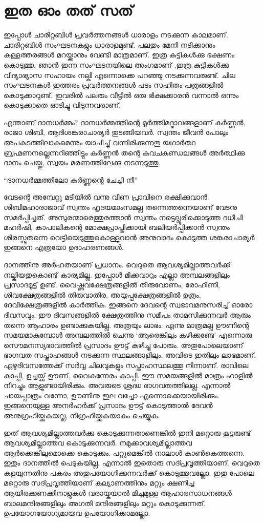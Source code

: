 \chapter{ഇത ഓം തത് സത്}
ഇപ്പോൾ ചാരിറ്റബിൾ പ്രവർത്തനങ്ങൾ ധാരാളം നടക്കുന്ന കാലമാണ്‌. ചാരിറ്റബിൾ സംഘടനകളും ധാരാളമുണ്ട്‌. പലതും മേനി നടിക്കാനും കള്ളത്തരങ്ങൾ മറയ്ക്കാനും വേണ്ടി മാത്രമാണ്‌. ഇത്ര കുട്ടികൾക്കു ഭക്ഷണം കൊടുത്തു, ഞാൻ ഇന്ന സംഘടനയിലെ അംഗമാണ്‌ ,ഇത്ര കുട്ടികൾക്കു വിദ്യാഭ്യാസ സഹായം നല്കി എന്നൊക്കെ പറഞ്ഞു നടക്കുന്നവരുണ്ട്‌. ചില സംഘടനകൾ ഇത്തരം പ്രവർത്തനങ്ങൾ പടം സഹിതം പത്രങ്ങളിൽ കൊടുക്കാറുണ്ട്‌. ഇവരിൽ പലരും വീട്ടിൽ ഒരു ഭിക്ഷക്കാരൻ വന്നാൽ ഒന്നും കൊടുക്കാതെ ഓടിച്ചു വിടുന്നവരാണ്‌. \par
എന്താണ്‌ ദാനധർമ്മം? ദാനധർമ്മത്തിന്റെ മൂർത്തിമദ്ഭാവങ്ങളാണ്‌ കർണ്ണൻ, രാജാ ശിബി, ആദിശങ്കരാചാര്യർ തുടങ്ങിയവർ. സ്വന്തം ജീവൻ പോലും അപകടത്തിലാകുമെന്നും യാചിച്ചു് വന്നിരിക്കുന്നതു യഥാർത്ഥ ബ്രഹ്മണനല്ലെന്നറിഞ്ഞിട്ടും കർണ്ണൻ തന്റെ കവചകുണ്ഡലങ്ങൾ അർത്ഥിക്കു ദാനം ചെയ്തു, സ്വയം മരണത്തിലേക്കു നടന്നടുത്തു.
\begin{center}
“ദാനധർമ്മത്തിലോ കർണ്ണന്റെ ചേച്ചി നീ”
\end{center}
വേടന്റെ അമ്പേറ്റു മടിയിൽ വന്നു വീണ പ്രാവിനെ രക്ഷിക്കുവാൻ ശിബിമഹാരാജാവ് സ്വന്തം ഹൃദയമാംസമല്ല തന്നെത്തന്നെയാണ്‌ വേടനു സമർപ്പിച്ചത്. അസുരന്മാരെത്തുരത്താൻ സ്വന്തം നട്ടെല്ലൂരിക്കൊടുത്ത ദധീചി മഹർഷി, കാപാലികന്റെ മോക്ഷപ്രാപ്തിക്കായി ബലിയർപ്പിക്കാൻ സ്വന്തം ശിരസ്സുതന്നെ വെട്ടിയെടുത്തുകൊള്ളുവാൻ അനുവാദം കൊടുത്ത ശങ്കരാചാര്യർ ഇങ്ങനെ എത്രയോ ഉദാഹരണങ്ങൾ. \par
ദാനത്തിനു അർഹതയാണ്‌ പ്രധാനം. വെറുതെ ആവശ്യമില്ലാത്തവർക്ക് നല്കിയതുകൊണ്ട് കാര്യമില്ല. ഇപ്പോൾ മിക്കവാറും എല്ലാ അമ്പലങ്ങളിലും പ്രസാദമൂട്ട് ഉണ്ട്. വൈഷ്ണവക്ഷേത്രങ്ങളിൽ തിരുവോണം, രോഹിണി, ശിവക്ഷേത്രങ്ങളിൽ തിരുവാതിര, അയ്യപ്പക്ഷേത്രങ്ങളിൽ ഉത്രം, ദേവീക്ഷേത്രങ്ങളിൽ കാർത്തിക. ഇങ്ങനെ ദേവന്റെ സ്വഭാവമനുസരിച്ച് ഓരോ ദിവസവും. ഈ ദിവസങ്ങളിൽ ക്ഷേത്രത്തിനു സമീപം താമസിക്കുന്നവർ ആരും തന്നെ ആഹാരം ഉണ്ടാക്കുകയില്ല. അത്രയും ലാഭം. എന്നു മാത്രമല്ല ഊണിന്റെ സമയമാകുമ്പോൾ അമ്പലത്തിൽ  ചെന്നു ‘ആരെങ്കിലും കഴിക്കണ്ടേ’ എന്നൊരു സൌമനസ്യഭാവത്തിൽ പ്രസാദം ഊട്ട് കഴിച്ചു പോരും. അതുപോലെയാണ്‌ ഭാഗവത സപ്താഹങ്ങൾ നടക്കുന്ന സ്ഥലങ്ങാളിലും. അവിടെ ഇതിലും ലാഭമാണ്‌. ഏഴുദിവസത്തേക്ക് സർവ്വ ചിലവുകളും സപ്താഹസ്ഥലത്തു നിന്നാണ്‌. രാവിലെ കാപ്പി, ഉച്ചയ്ക്ക് ഊണ്, വൈകുന്നേരം കാപ്പി. ഈ സമയങ്ങളിൽ മാത്രം ഹാളിൽ നിറച്ചും ആളുണ്ടായിരിക്കും. അവരുടെ ശ്രദ്ധ ഭാഗവതത്തിലല്ല. എന്നാൽ ചായപ്പാത്രം വന്നോ, ഊണിനു ഇല വച്ചോ എന്നൊക്കെയായിരിക്കും. ഇങ്ങനെയുള്ള അനർഹർക്ക് പ്രസാദം ഊട്ട് കൊടുത്താൽ ദേവൻ അനുഗ്രഹിയ്ക്കുകയല്ല, നിഗ്രഹിയ്ക്കുകയാകും ചെയ്യുക.\par
ഇത് ആവശ്യമില്ലാത്തവർക്കു കൊടുക്കുന്നതാണെങ്കിൽ ഇനി മറ്റൊരു കൂട്ടരുണ്ട് ആവശ്യമില്ലാത്തവ കൊടുക്കുന്നവർ. നമുക്കാവശ്യമില്ലാത്തവ ആർക്കെങ്കിലുമൊക്കെ കൊടുക്കും. പറ്റുമെങ്കിൽ നാലാൾ കാൺകെത്തന്നെ. ഇതും ദാനത്തിൽ പെടുകയില്ല. എന്നാൽ ഇതൊരു സദ്പ്രവൃത്തിയാണ്‌. വെറുതെ കളയുന്നതിനു പകരം അതുപയോഗിക്കുന്നവർക്ക് കൊടുത്തുവല്ലോ. ഇതു പോലെ മറ്റൊരു സദ്പ്രവൃത്തിയാണ് കല്യാണത്തിനും മറ്റും ക്ഷണിച്ച ആയിരക്കണക്കിനാളുകൾ വരായ്കയാൽ മിച്ചമുള്ള ആഹാരസാധനങ്ങൾ ബാലമന്ദിരങ്ങളിലും അഗതി മന്ദിരങ്ങളിലും മറ്റും കൊടുക്കുന്നത്. ഉപയോഗയോഗ്യമായവ ഉപയോഗിക്കാമല്ലോ.\par
